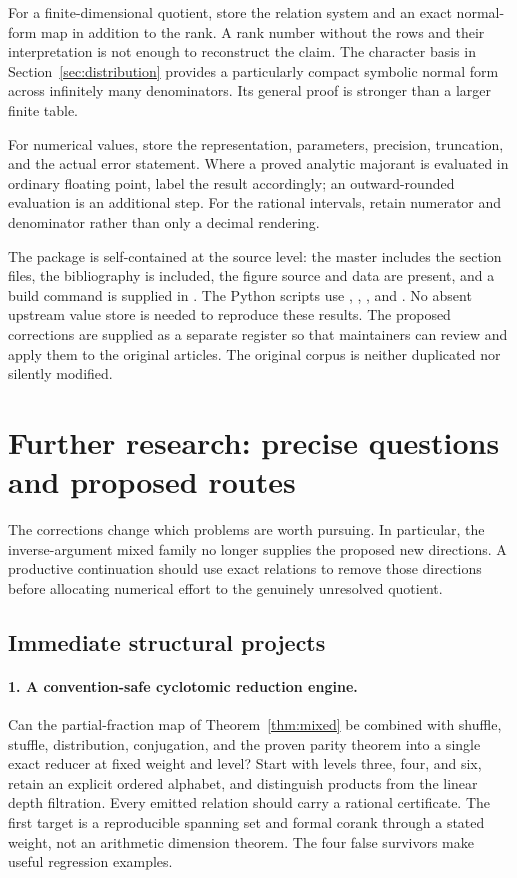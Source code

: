 For a finite-dimensional quotient, store the relation system and an
exact normal-form map in addition to the rank. A rank number without
the rows and their interpretation is not enough to reconstruct the
claim. The character basis in Section~\ref{sec:distribution} provides
a particularly compact symbolic normal form across infinitely many
denominators. Its general proof is stronger than a larger finite table.

For numerical values, store the representation, parameters, precision,
truncation, and the actual error statement. Where a proved analytic
majorant is evaluated in ordinary floating point, label the result
accordingly; an outward-rounded evaluation is an additional step.
For the rational intervals, retain numerator and denominator rather
than only a decimal rendering.

The package is self-contained at the source level: the master
 includes the section files, the bibliography is
included, the figure source and data are present, and a build command
is supplied in . The Python scripts use
, , , and .
No absent upstream value store is needed to reproduce these results.
The proposed corrections are supplied as a separate register so that
maintainers can review and apply them to the original articles.
The original corpus is neither duplicated nor silently modified.

\section{Further research: precise questions and proposed routes}
\label{sec:questions}

The corrections change which problems are worth pursuing. In
particular, the inverse-argument mixed family no longer supplies the
proposed new directions. A productive continuation should use exact
relations to remove those directions before allocating numerical
effort to the genuinely unresolved quotient.

\subsection{Immediate structural projects}

\paragraph{1. A convention-safe cyclotomic reduction engine.}
Can the partial-fraction map of Theorem~\ref{thm:mixed} be combined
with shuffle, stuffle, distribution, conjugation, and the proven
parity theorem into a single exact reducer at fixed weight and level?
Start with levels three, four, and six, retain an explicit ordered
alphabet, and distinguish products from the linear depth filtration.
Every emitted relation should carry a rational certificate.
The first target is a reproducible spanning set and formal corank
through a stated weight, not an arithmetic dimension theorem.
The four false survivors make useful regression examples.

